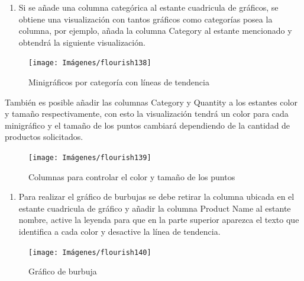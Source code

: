 \documentclass[
]{book}
\providecommand{\tightlist}{%
  \setlength{\itemsep}{0pt}\setlength{\parskip}{0pt}}
\begin{document}
\begin{enumerate}
\def\labelenumi{\arabic{enumi}.}
\setcounter{enumi}{1}
\tightlist
\item
  Si se añade una columna categórica al estante cuadricula de gráficos, se obtiene una visualización con tantos gráficos como categorías posea la columna, por ejemplo, añada la columna Category al estante mencionado y obtendrá la siguiente visualización.
\end{enumerate}

\begin{figure}

{\centering \texttt{[image: Imágenes/flourish138]} 

}

\caption{Minigráficos por categoría con líneas de tendencia}\label{fig:minidispersioncotendenciaflourish-fig}
\end{figure}

También es posible añadir las columnas Category y Quantity a los estantes color y tamaño respectivamente, con esto la visualización tendrá un color para cada minigráfico y el tamaño de los puntos cambiará dependiendo de la cantidad de productos solicitados.

\begin{figure}

{\centering \texttt{[image: Imágenes/flourish139]} 

}

\caption{Columnas para controlar el color y tamaño de los puntos}\label{fig:minidispersioncolortendenciaflourish-fig}
\end{figure}

\begin{enumerate}
\def\labelenumi{\arabic{enumi}.}
\setcounter{enumi}{2}
\tightlist
\item
  Para realizar el gráfico de burbujas se debe retirar la columna ubicada en el estante cuadricula de gráfico y añadir la columna Product Name al estante nombre, active la leyenda para que en la parte superior aparezca el texto que identifica a cada color y desactive la línea de tendencia.
\end{enumerate}

\begin{figure}

{\centering \texttt{[image: Imágenes/flourish140]} 

}

\caption{Gráfico de burbuja}\label{fig:graficoburbujaflourish-fig}
\end{figure}
\end{document}
